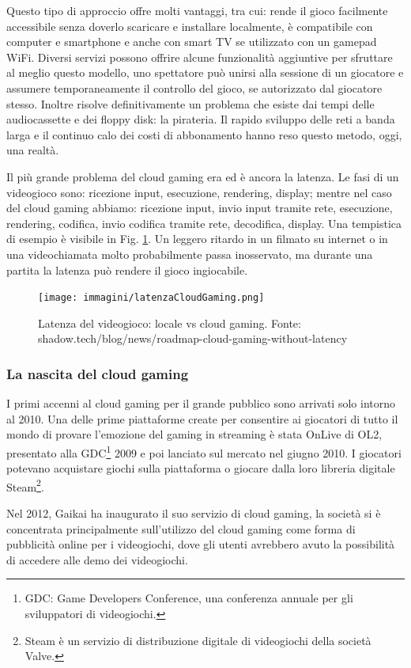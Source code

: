Questo tipo di approccio offre molti vantaggi, tra cui: rende il gioco facilmente accessibile senza doverlo scaricare e installare localmente, è compatibile con computer e smartphone e anche con smart TV se utilizzato con un gamepad WiFi. Diversi servizi possono offrire alcune funzionalità aggiuntive per sfruttare al meglio questo modello, uno spettatore può unirsi alla sessione di un giocatore e assumere temporaneamente il controllo del gioco, se autorizzato dal giocatore stesso. Inoltre risolve definitivamente un problema che esiste dai tempi delle audiocassette e dei floppy disk: la pirateria. Il rapido sviluppo delle reti a banda larga e il continuo calo dei costi di abbonamento hanno reso questo metodo, oggi, una realtà.

Il più grande problema del cloud gaming era ed è ancora la latenza. Le fasi di un videogioco sono: ricezione input, esecuzione, rendering, display; mentre nel caso del cloud gaming abbiamo: ricezione input, invio input tramite rete, esecuzione, rendering, codifica, invio codifica tramite rete, decodifica, display. Una tempistica di esempio è visibile in Fig. \ref{fig:latenzaCloudGaming}. Un leggero ritardo in un filmato su internet o in una videochiamata molto probabilmente passa inosservato, ma durante una partita la latenza può rendere il gioco ingiocabile.

\begin{figure}[H]
	\texttt{[image: immagini/latenzaCloudGaming.png]}
	\caption{Latenza del videogioco: locale vs cloud gaming. Fonte: shadow.tech/blog/news/roadmap-cloud-gaming-without-latency}
	\label{fig:latenzaCloudGaming}
\end{figure}

\subsubsection{La nascita del cloud gaming}
I primi accenni al cloud gaming per il grande pubblico sono arrivati solo intorno al 2010. Una delle prime piattaforme create per consentire ai giocatori di tutto il mondo di provare l'emozione del gaming in streaming è stata OnLive di OL2, presentato alla GDC\footnote{GDC: Game Developers Conference, una conferenza annuale per gli sviluppatori di videogiochi.} 2009 e poi lanciato sul mercato nel giugno 2010. I giocatori potevano acquistare giochi sulla piattaforma o giocare dalla loro libreria digitale Steam\footnote{Steam è un servizio di distribuzione digitale di videogiochi della società Valve.}.

Nel 2012, Gaikai ha inaugurato il suo servizio di cloud gaming, la società si è concentrata principalmente sull'utilizzo del cloud gaming come forma di pubblicità online per i videogiochi, dove gli utenti avrebbero avuto la possibilità di accedere alle demo dei videogiochi.

